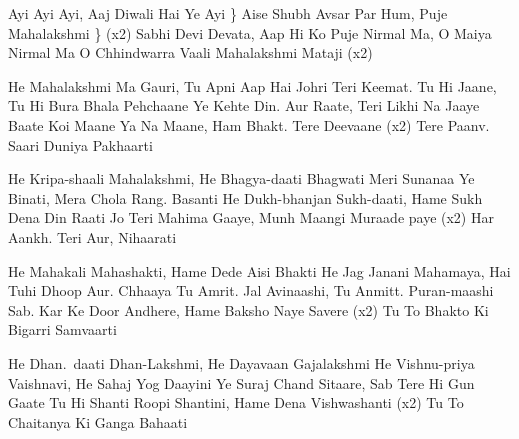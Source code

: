     \beginchorus{}
        Ayi Ayi Ayi, Aaj Diwali Hai Ye Ayi \}
        Aise Shubh Avsar Par Hum, Puje Mahalakshmi \} (x2)
        Sabhi Devi Devata, Aap Hi Ko Puje
        Nirmal Ma, O Maiya Nirmal Ma
        O Chhindwarra Vaali Mahalakshmi Mataji (x2)
    \endchorus{}

    \beginverse{}
        He Mahalakshmi Ma Gauri, Tu Apni Aap Hai Johri
        Teri Keemat. Tu Hi Jaane, Tu Hi Bura Bhala Pehchaane
        Ye Kehte Din. Aur Raate, Teri Likhi Na Jaaye Baate
        Koi Maane Ya Na Maane, Ham Bhakt. Tere Deevaane (x2)
        Tere Paanv. Saari Duniya Pakhaarti
    \endverse{}

    \beginverse{}
        He Kripa-shaali Mahalakshmi, He Bhagya-daati Bhagwati
        Meri Sunanaa Ye Binati, Mera Chola Rang. Basanti
        He Dukh-bhanjan Sukh-daati, Hame Sukh Dena Din Raati
        Jo Teri Mahima Gaaye, Munh Maangi Muraade paye (x2)
        Har Aankh. Teri Aur, Nihaarati
    \endverse{}

    \beginverse{}
        He Mahakali Mahashakti, Hame Dede Aisi Bhakti
        He Jag Janani Mahamaya, Hai Tuhi Dhoop Aur. Chhaaya
        Tu Amrit. Jal Avinaashi, Tu Anmitt. Puran-maashi
        Sab. Kar Ke Door Andhere, Hame Baksho Naye Savere (x2)
        Tu To Bhakto Ki Bigarri Samvaarti
    \endverse{}

    \beginverse{}
        He Dhan.\ daati Dhan-Lakshmi, He Dayavaan Gajalakshmi
        He Vishnu-priya Vaishnavi, He Sahaj Yog Daayini
        Ye Suraj Chand Sitaare, Sab Tere Hi Gun Gaate
        Tu Hi Shanti Roopi Shantini, Hame Dena Vishwashanti (x2)
        Tu To Chaitanya Ki Ganga Bahaati
    \endverse{}
\endsong{}

\newpage